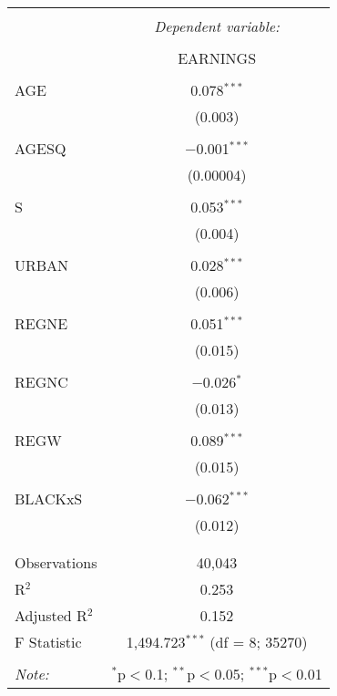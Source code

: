 \documentclass[
]{article}
\begin{document}
\begin{table}[!htbp] \centering 
  \caption{} 
  \label{} 
\begin{tabular}{@{\extracolsep{5pt}}lc} 
\\[-1.8ex]\hline 
\hline \\[-1.8ex] 
 & \multicolumn{1}{c}{\textit{Dependent variable:}} \\ 
\cline{2-2} 
\\[-1.8ex] & EARNINGS \\ 
\hline \\[-1.8ex] 
 AGE & 0.078$^{***}$ \\ 
  & (0.003) \\ 
  & \\ 
 AGESQ & $-$0.001$^{***}$ \\ 
  & (0.00004) \\ 
  & \\ 
 S & 0.053$^{***}$ \\ 
  & (0.004) \\ 
  & \\ 
 URBAN & 0.028$^{***}$ \\ 
  & (0.006) \\ 
  & \\ 
 REGNE & 0.051$^{***}$ \\ 
  & (0.015) \\ 
  & \\ 
 REGNC & $-$0.026$^{*}$ \\ 
  & (0.013) \\ 
  & \\ 
 REGW & 0.089$^{***}$ \\ 
  & (0.015) \\ 
  & \\ 
 BLACKxS & $-$0.062$^{***}$ \\ 
  & (0.012) \\ 
  & \\ 
\hline \\[-1.8ex] 
Observations & 40,043 \\ 
R$^{2}$ & 0.253 \\ 
Adjusted R$^{2}$ & 0.152 \\ 
F Statistic & 1,494.723$^{***}$ (df = 8; 35270) \\ 
\hline 
\hline \\[-1.8ex] 
\textit{Note:}  & \multicolumn{1}{r}{$^{*}$p$<$0.1; $^{**}$p$<$0.05; $^{***}$p$<$0.01} \\ 
\end{tabular} 
\end{table}
\end{document}
